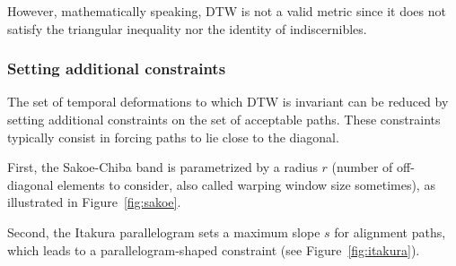 However, mathematically speaking, DTW is not a valid metric since it does
not satisfy the triangular inequality nor the identity of indiscernibles.

\subsubsection{Setting additional constraints}

The set of temporal deformations to which DTW is invariant can be reduced by
setting additional constraints on the set of acceptable paths.
These constraints typically consist in forcing paths to lie close to the
diagonal.

First, the Sakoe-Chiba band is parametrized by a radius $r$ (number of
off-diagonal elements to consider, also called warping window size sometimes),
as illustrated in Figure~\ref{fig:sakoe}.

Second, the Itakura parallelogram sets a maximum slope $s$ for alignment
paths, which leads to a parallelogram-shaped constraint (see Figure~\ref{fig:itakura}).

